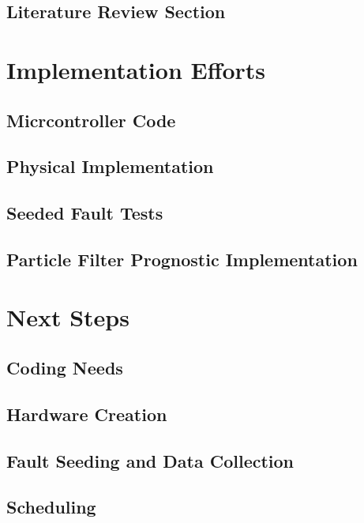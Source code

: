 \documentclass[12pt]{article}
\begin{document}
\subsection{Literature Review Section}

\section{Implementation Efforts}
\subsection{Micrcontroller Code}
\subsection{Physical Implementation}
\subsection{Seeded Fault Tests}
\subsection{Particle Filter Prognostic Implementation}

\section{Next Steps}
\subsection{Coding Needs}
\subsection{Hardware Creation}
\subsection{Fault Seeding and Data Collection}
\subsection{Scheduling}
\end{document}
